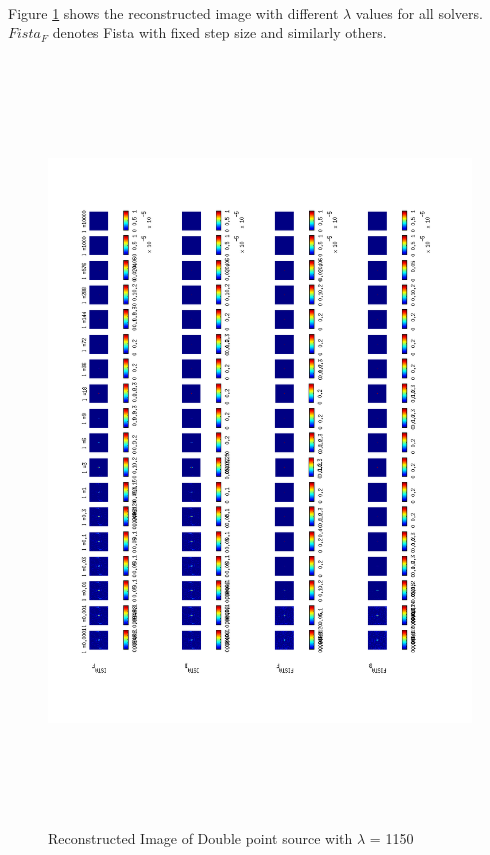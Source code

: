 \paragraph{}Figure \ref{Figsubplot} shows the reconstructed image with different
$\lambda$ values for all solvers. $Fista_F$ denotes Fista with fixed step size and 
similarly others.

\begin{figure}[!htbp]
  \begin{center}
      \includegraphics[width=7in,height=8in]{figures/subplots}
    \caption{Reconstructed Image of Double point source with $\lambda$ = 1150}
    \label{Figsubplot}
  \end{center}
\end{figure}
